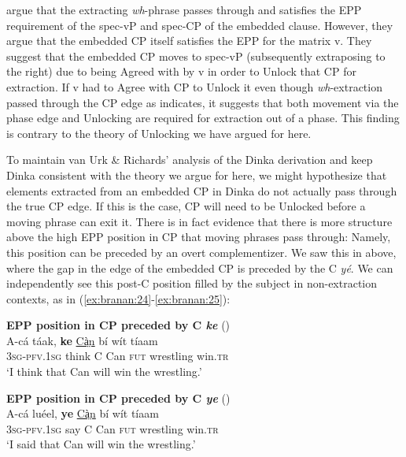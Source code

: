 \documentclass[output=paper,colorlinks,citecolor=brown]{langscibook}
\begin{document}
\citeauthor{VanUrkRichards2015} argue that the extracting \textit{wh}-phrase passes through and satisfies the EPP requirement of the spec-vP and spec-CP of the embedded clause. However, they argue that the embedded CP itself satisfies the EPP for the matrix v. They suggest that the embedded CP moves to spec-vP (subsequently extraposing to the right) due to being Agreed with by v in order to Unlock that CP for extraction. If v had to Agree with CP to Unlock it even though \textit{wh}-extraction passed through the CP edge as  indicates, it suggests that both movement via the phase edge and Unlocking are required for extraction out of a phase. This finding is contrary to the theory of Unlocking we have argued for here.

To maintain van Urk \& Richards' analysis of the Dinka derivation and keep Dinka consistent with the theory we argue for here, we might hypothesize that elements extracted from an embedded CP in Dinka do not actually pass through the true CP edge. If this is the case, CP will need to be Unlocked before a moving phrase can exit it. There is in fact evidence that there is more structure above the high EPP position in CP that moving phrases pass through: Namely, this position can be preceded by an overt complementizer. We saw this in  above, where the gap in the edge of the embedded CP is preceded by the C \textit{y\'{e}}. We can independently see this post-C position filled by the subject in non-extraction contexts, as in (\ref{ex:branan:24}-\ref{ex:branan:25}):

\ea%
    \label{ex:branan:24}
    \textbf{EPP position in CP preceded by C \textit{ke}} 
    \hfill{(\citealt[ex. 4a]{VanUrkRichards2015})}\\
    \gll    A-c\'{a} t\'{a}ak, \textbf{ke}  \underline{Cà̤n} b\'{i}  w\'{i}t t\'{i}aam \\
            3\textsc{sg-pfv.1sg} think C Can \textsc{fut} wrestling win.\textsc{tr} \\
    \glt    `I think that Can will win the wrestling.'
\z

\ea%
    \label{ex:branan:25}
    \textbf{EPP position in CP preceded by C \textit{ye}} 
    \hfill{(\citealt[ex. 4b]{VanUrkRichards2015})}\\
    \gll    A-c\'{a} lu\'{e}el, \textbf{ye}  \underline{Cà̤n} b\'{i}  w\'{i}t t\'{i}aam \\
            3\textsc{sg-pfv.1sg} say C Can \textsc{fut} wrestling win.\textsc{tr}  \\
    \glt    `I said that Can will win the wrestling.'
\z
\end{document}
